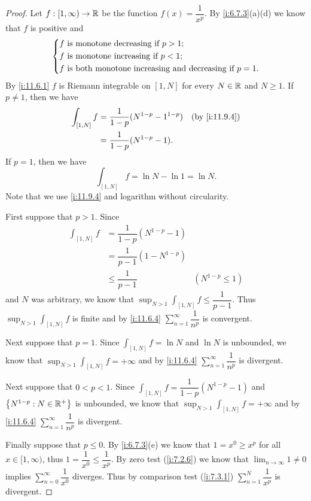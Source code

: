 \begin{proof}
  Let \(f : [1, \infty) \to \mathbb{R}\) be the function \(f(x) = \dfrac{1}{x^p}\).
  By \cref{i:6.7.3}(a)(d) we know that \(f\) is positive and
  \[
    \begin{dcases}
      f \text{ is monotone decreasing if } p > 1; \\
      f \text{ is monotone increasing if } p < 1; \\
      f \text{ is both monotone increasing and decreasing if } p = 1.
    \end{dcases}
  \]
  By \cref{i:11.6.1} \(f\) is Riemann integrable on \([1, N]\) for every \(N \in \mathbb{R}\) and \(N \geq 1\).
  If \(p \neq 1\), then we have
  \begin{align*}
    \int_{[1, N]} f & = \dfrac{1}{1 - p} (N^{1 - p} - 1^{1 - p}) &  & \by{i:11.9.4} \\
                    & = \dfrac{1}{1 - p} (N^{1 - p} - 1).
  \end{align*}
  If \(p = 1\), then we have
  \[
    \int_{[1, N]} f = \ln N - \ln 1 = \ln N.
  \]
  Note that we use \cref{i:11.9.4} and logarithm without circularity.

  First suppose that \(p > 1\).
  Since
  \begin{align*}
    \int_{[1, N]} f & = \dfrac{1}{1 - p} (N^{1 - p} - 1)                      \\
                    & = \dfrac{1}{p - 1} (1 - N^{1 - p})                      \\
                    & \leq \dfrac{1}{p - 1}              & (N^{1 - p} \leq 1)
  \end{align*}
  and \(N\) was arbitrary, we know that \(\sup_{N > 1} \int_{[1, N]} f \leq \dfrac{1}{p - 1}\).
  Thus \(\sup_{N > 1} \int_{[1, N]} f\) is finite and by \cref{i:11.6.4} \(\sum_{n = 1}^\infty \dfrac{1}{n^p}\) is convergent.

  Next suppose that \(p = 1\).
  Since \(\int_{[1, N]} f = \ln N\) and \(\ln N\) is unbounded, we know that \(\sup_{N > 1} \int_{[1, N]} f = +\infty\) and by \cref{i:11.6.4} \(\sum_{n = 1}^\infty \dfrac{1}{n^p}\) is divergent.

  Next suppose that \(0 < p < 1\).
  Since \(\int_{[1, N]} f = \dfrac{1}{1 - p} (N^{1 - p} - 1)\) and \(\left\lbrace N^{1 - p} : N \in \mathbb{R}^+\right\rbrace\) is unbounded, we know that \(\sup_{N > 1} \int_{[1, N]} f = +\infty\) and by \cref{i:11.6.4} \(\sum_{n = 1}^\infty \dfrac{1}{n^p}\) is divergent.

  Finally suppose that \(p \leq 0\).
  By \cref{i:6.7.3}(e) we know that \(1 = x^0 \geq x^p\) for all \(x \in [1, \infty)\), thus \(1 = \dfrac{1}{x^0} \leq \dfrac{1}{x^p}\).
  By zero test (\cref{i:7.2.6}) we know that \(\lim_{n \to \infty} 1 \neq 0\) implies \(\sum_{n = 0}^\infty \dfrac{1}{x^0}\) diverges.
  Thus by comparison test (\cref{i:7.3.1}) \(\sum_{n = 1}^N \dfrac{1}{x^p}\) is divergent.
\end{proof}

